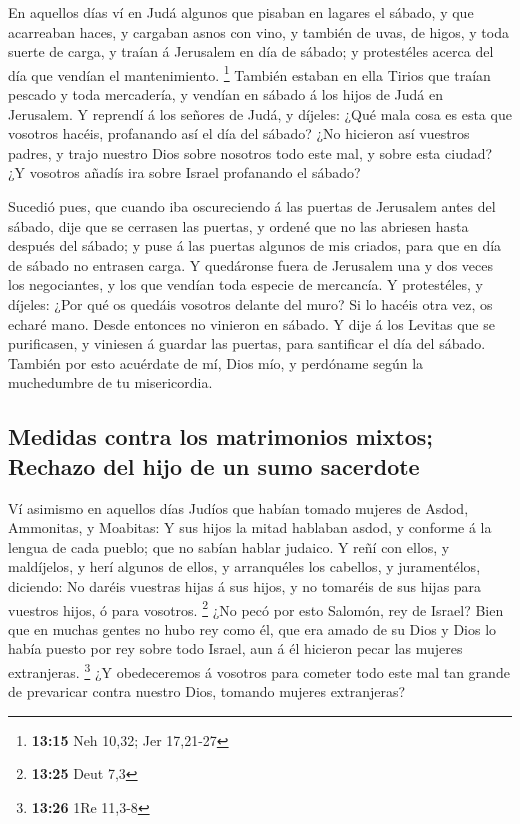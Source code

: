  En aquellos días ví en Judá algunos que pisaban en
lagares el sábado, y que acarreaban haces, y cargaban asnos con vino, y
también de uvas, de higos, y toda suerte de carga, y traían á Jerusalem
en día de sábado; y protestéles acerca del día que vendían el
mantenimiento. \footnote{\textbf{13:15} Neh 10,32; Jer 17,21-27}
 También estaban en ella Tirios que traían pescado y toda
mercadería, y vendían en sábado á los hijos de Judá en Jerusalem.
 Y reprendí á los señores de Judá, y díjeles: ¿Qué mala
cosa es esta que vosotros hacéis, profanando así el día del sábado?
 ¿No hicieron así vuestros padres, y trajo nuestro Dios
sobre nosotros todo este mal, y sobre esta ciudad? ¿Y vosotros añadís
ira sobre Israel profanando el sábado?

 Sucedió pues, que cuando iba oscureciendo á las puertas
de Jerusalem antes del sábado, dije que se cerrasen las puertas, y
ordené que no las abriesen hasta después del sábado; y puse á las
puertas algunos de mis criados, para que en día de sábado no entrasen
carga.  Y quedáronse fuera de Jerusalem una y dos veces
los negociantes, y los que vendían toda especie de mercancía.
 Y protestéles, y díjeles: ¿Por qué os quedáis vosotros
delante del muro? Si lo hacéis otra vez, os echaré mano. Desde entonces
no vinieron en sábado.  Y dije á los Levitas que se
purificasen, y viniesen á guardar las puertas, para santificar el día
del sábado. También por esto acuérdate de mí, Dios mío, y perdóname
según la muchedumbre de tu misericordia.

\hypertarget{medidas-contra-los-matrimonios-mixtos-rechazo-del-hijo-de-un-sumo-sacerdote}{%
\subsection{Medidas contra los matrimonios mixtos; Rechazo del hijo de
un sumo
sacerdote}\label{medidas-contra-los-matrimonios-mixtos-rechazo-del-hijo-de-un-sumo-sacerdote}}

 Ví asimismo en aquellos días Judíos que habían tomado
mujeres de Asdod, Ammonitas, y Moabitas:  Y sus hijos la
mitad hablaban asdod, y conforme á la lengua de cada pueblo; que no
sabían hablar judaico.  Y reñí con ellos, y maldíjelos, y
herí algunos de ellos, y arranquéles los cabellos, y juramentélos,
diciendo: No daréis vuestras hijas á sus hijos, y no tomaréis de sus
hijas para vuestros hijos, ó para vosotros. \footnote{\textbf{13:25}
  Deut 7,3}  ¿No pecó por esto Salomón, rey de Israel?
Bien que en muchas gentes no hubo rey como él, que era amado de su Dios
y Dios lo había puesto por rey sobre todo Israel, aun á él hicieron
pecar las mujeres extranjeras. \footnote{\textbf{13:26} 1Re 11,3-8}
 ¿Y obedeceremos á vosotros para cometer todo este mal
tan grande de prevaricar contra nuestro Dios, tomando mujeres
extranjeras?


